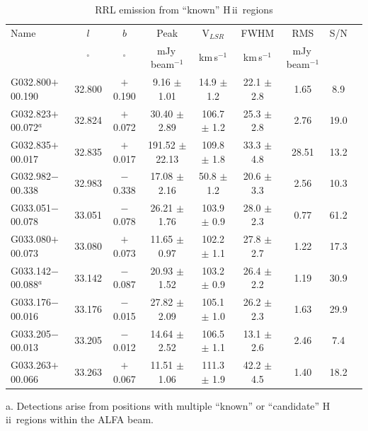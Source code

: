 \documentclass[manuscript]{aastex61}
\newcommand{\hii}{{\rm H\,}{{\sc ii}}}
\begin{document}
\begin{table}[htbp]
\centering
\caption{RRL emission from ``known'' \hii\ regions}\label{tab_hii_k_sample}
\begin{threeparttable}
\begin{tabular*}{\textwidth}{l@{\extracolsep{\fill}}*{8}{c}}
\hline
\hline
Name & $l$ & $b$ & Peak& V$_{LSR}$& FWHM& RMS& S/N\\
&$^\circ$&$^\circ$&mJy\,beam$^{-1}$&km\,s$^{-1}$&km\,s$^{-1}$&mJy\,beam$^{-1}$& \\
\hline
G032.800$+$00.190     &32.800&	$+$0.190	&9.16	$\pm$ 1.01	&14.9	$\pm$ 1.2	&22.1	$\pm$ 2.8	&1.65	&8.9 \\ 
G032.823$+$00.072$^a$ &32.824&	$+$0.072	&30.40	$\pm$ 2.89	&106.7	$\pm$ 1.2	&25.3	$\pm$ 2.8	&2.76	&19.0\\
G032.835$+$00.017     &32.835&	$+$0.017	&191.52	$\pm$ 22.13	&109.8	$\pm$ 1.8	&33.3	$\pm$ 4.8	&28.51	&13.2\\
G032.982$-$00.338     &32.983&	$-$0.338	&17.08	$\pm$ 2.16	&50.8	$\pm$ 1.2	&20.6	$\pm$ 3.3	&2.56	&10.3\\
G033.051$-$00.078     &33.051&	$-$0.078	&26.21	$\pm$ 1.76	&103.9	$\pm$ 0.9	&28.0	$\pm$ 2.3	&0.77	&61.2\\
G033.080$+$00.073     &33.080&	$+$0.073	&11.65	$\pm$ 0.97	&102.2	$\pm$ 1.1	&27.8	$\pm$ 2.7	&1.22	&17.3\\
G033.142$-$00.088$^a$ &33.142&	$-$0.087	&20.93	$\pm$ 1.52	&103.2	$\pm$ 0.9	&26.4	$\pm$ 2.2	&1.19	&30.9\\
G033.176$-$00.016     &33.176&	$-$0.015	&27.82	$\pm$ 2.09	&105.1	$\pm$ 1.0	&26.2	$\pm$ 2.3	&1.63	&29.9\\
G033.205$-$00.013     &33.205&	$-$0.012	&14.64	$\pm$ 2.52	&106.5	$\pm$ 1.1	&13.1	$\pm$ 2.6	&2.46	&7.4\\
G033.263$+$00.066     &33.263&	$+$0.067	&11.51	$\pm$ 1.06	&111.3	$\pm$ 1.9	&42.2	$\pm$ 4.5	&1.40	&18.2\\
\hline
\end{tabular*}
\begin{tablenotes}
      \small
      \item a. Detections arise from positions with multiple ``known'' or ``candidate'' \hii\ regions within the ALFA beam.
\end{tablenotes}
\end{threeparttable}
\end{table}
\end{document}
